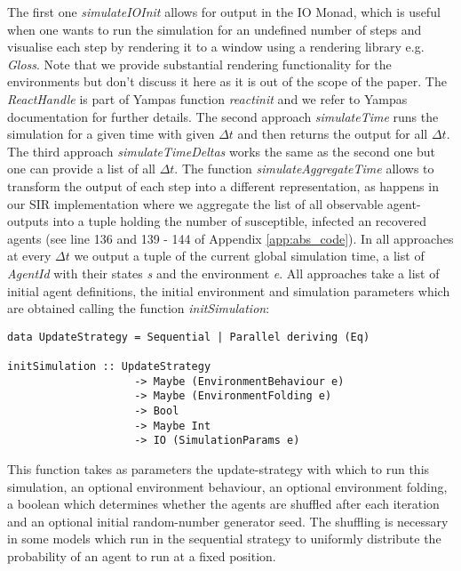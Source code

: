 The first one \textit{simulateIOInit} allows for output in the IO Monad, which is useful when one wants to run the simulation for an undefined number of steps and visualise each step by rendering it to a window using a rendering library e.g. \textit{Gloss}. Note that we provide substantial rendering functionality for the environments but don't discuss it here as it is out of the scope of the paper. The \textit{ReactHandle} is part of Yampas function \textit{reactinit} and we refer to Yampas documentation for further details. The second approach \textit{simulateTime} runs the simulation for a given time with given $\Delta t$ and then returns the output for all $\Delta t$. The third approach \textit{simulateTimeDeltas} works the same as the second one but one can provide a list of all $\Delta t$. The function \textit{simulateAggregateTime} allows to transform the output of each step into a different representation, as happens in our SIR implementation where we aggregate the list of all observable agent-outputs into a tuple holding the number of susceptible, infected an recovered agents (see line 136 and 139 - 144 of Appendix \ref{app:abs_code}).
In all approaches at every $\Delta t$ we output a tuple of the current global simulation time, a list of \textit{AgentId} with their states \textit{s} and the environment \textit{e}. All approaches take a list of initial agent definitions, the initial environment and simulation parameters which are obtained calling the function \textit{initSimulation}:

\begin{verbatim}
data UpdateStrategy = Sequential | Parallel deriving (Eq)

initSimulation :: UpdateStrategy
                    -> Maybe (EnvironmentBehaviour e)
                    -> Maybe (EnvironmentFolding e)
                    -> Bool
                    -> Maybe Int
                    -> IO (SimulationParams e)
\end{verbatim}

This function takes as parameters the update-strategy with which to run this simulation, an optional environment behaviour, an optional environment folding, a boolean which determines whether the agents are shuffled after each iteration and an optional initial random-number generator seed. The shuffling is necessary in some models which run in the sequential strategy to uniformly distribute the probability of an agent to run at a fixed position.


